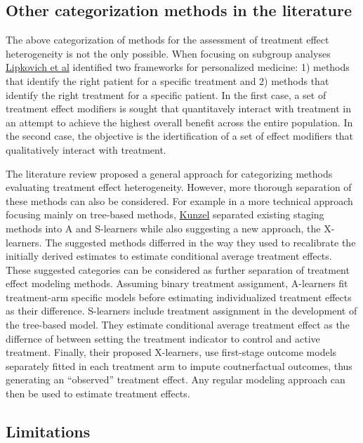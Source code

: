 \documentclass[
]{book}
\begin{document}
\hypertarget{other-categorization-methods-in-the-literature}{%
\subsection{Other categorization methods in the literature}\label{other-categorization-methods-in-the-literature}}

The above categorization of methods for the assessment of treatment effect
heterogeneity is not the only possible. When focusing on subgroup analyses
\href{https://onlinelibrary.wiley.com/doi/full/10.1002/sim.7064}{Lipkovich et al}
identified two frameworks for personalized medicine: 1) methods that identify
the right patient for a specific treatment and 2) methods that identify the
right treatment for a specific patient. In the first case, a set of treatment
effect modifiers is sought that quantitavely interact with treatment in an
attempt to achieve the highest overall benefit across the entire population. In
the second case, the objective is the idertification of a set of effect
modifiers that qualitatively interact with treatment.

The literature review proposed a general approach for categorizing methods
evaluating treatment effect heterogeneity. However, more thorough separation of
these methods can also be considered. For example in a more technical approach
focusing mainly on tree-based methods,
\href{https://doi.org/10.1073/pnas.1804597116}{Kunzel} separated existing staging
methods into A and S-learners while also suggesting a new approach, the
X-learners. The suggested methods differred in the way they used to recalibrate
the initially derived estimates to estimate conditional average treatment
effects. These suggested categories can be considered as further separation of
treatment effect modeling methods. Assuming binary treatment assignment,
A-learners fit treatment-arm specific models before estimating individualized
treatment effects as their difference. S-learners include treatment assignment
in the development of the tree-based model. They estimate conditional average
treatment effect as the differnce of between setting the treatment indicator to
control and active treatment. Finally, their proposed X-learners, use
first-stage outcome models separately fitted in each treatment arm to impute
coutnerfactual outcomes, thus generating an ``observed'' treatment effect. Any
regular modeling approach can then be used to estimate treatment effects.

\hypertarget{limitations}{%
\subsection{Limitations}\label{limitations}}
\end{document}
